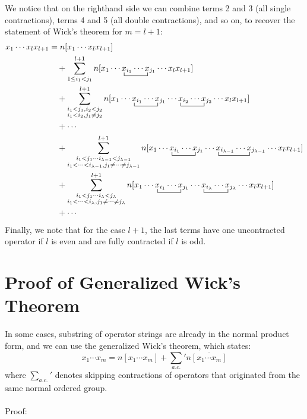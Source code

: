 \documentclass{article}
\newcommand{\ol}{\overline}
\newcommand{\ctr}{\bcontraction}
\newcommand{\cd}{\ensuremath{\cdots} }
\begin{document}
We notice that on the righthand side we can combine terms 2 and 3 (all single contractions), terms 4 and 5 (all double contractions), and so on, to 
recover the statement of Wick's theorem for $m = l+1$: 
\begin{align*}
x_1 \cd x_l x_{l + 1} 
&= n[x_1 \cd x_l x_{l + 1}  ]  \\
& \quad + \sum_{1 \leq i_1 <  j_1}^{l+1} n[x_1 \cd \ctr{}{x}{{}_{i_1}\cd}{x} x_{i_1}  \cd x_{j_1}  \cd x_l x_{l + 1} ]   \\
& \quad +   \sum_{\substack{i_1 < j_1,  i_2 < j_2 \\ i_1 < i_2, j_1 \neq j_2}}^{l+1}
n[x_1 \cd \ctr{}{x}{{}_{i_1}\cd}{x} x_{i_1}  \cd x_{j_1} \cd \ctr{}{x}{{}_{i_2}\cd}{x} x_{i_2}  \cd x_{j_2} \cd x_l x_{l + 1}  ] \\
 & \quad  +  \cd \\
& \quad +  \sum_{\substack{i_1 <  j_1 \cd  i_{\lambda - 1} < j_{\lambda - 1} \\ i_1 < \cd < i_{\lambda - 1}, j_1 \neq \cd \neq j_{\lambda-1}}}^{l+1}
n[x_1 \cd \ctr{}{x}{{}_{i_1}\cd}{x} x_{i_1}  \cd x_{j_1} \cd \ctr{}{x}{{}_{i_{\lambda -1} }\cd}{x} x_{i_{\lambda-1}}  \cd x_{j_{\lambda - 1}} \cd x_l  x_{l + 1}]   \\
& \quad +  \sum_{\substack{i_1 <  j_1 \cd  i_\lambda < j_\lambda \\ i_1 < \cd < i_\lambda, j_1 \neq \cd \neq j_\lambda}}^{l+1} 
n[x_1 \cd \ctr{}{x}{{}_{i_1}\cd}{x} x_{i_1}  \cd x_{j_1} \cd \ctr{}{x}{{}_{i_\lambda}\cd}{x} x_{i_\lambda}  \cd x_{j_\lambda} \cd x_l x_{l + 1} ] \\
& \quad + \cd
\end{align*}
Finally, we note that for the case $l+1$,
the last terms have one uncontracted operator if $l$ is even and are fully contracted if $l$ is odd. 

\section{Proof of Generalized Wick's Theorem}
In some cases, substring of operator strings are already in the normal product form, and we can use the generalized Wick's theorem, which states: 
$$x_1 \cd x_m = n[x_1 \cd x_m ]  + \sum_{a.c.} {}' n\ol{[x_1 \cd x_m ]} $$
where $\sum_{a.c.} {}' $ denotes skipping contractions of operators that originated from the same normal ordered group. 
\\ \\
Proof:
\end{document}
